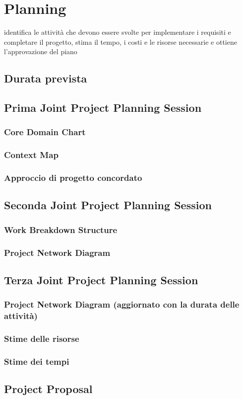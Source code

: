 \chapter{Planning}

identifica le attività che devono essere svolte per implementare i requisiti e completare il progetto, stima il tempo, i costi e le risorse necessarie e ottiene l'approvazione del piano
\section{Durata prevista}

\section{Prima Joint Project Planning Session}
\subsection{Core Domain Chart}
\subsection{Context Map}
\subsection{Approccio di progetto concordato}

\section{Seconda Joint Project Planning Session}
\subsection{Work Breakdown Structure}
\subsection{Project Network Diagram}

\section{Terza Joint Project Planning Session}
\subsection{Project Network Diagram (aggiornato con la durata delle attività)}
\subsection{Stime delle risorse}
\subsection{Stime dei tempi}

\section{Project Proposal}

